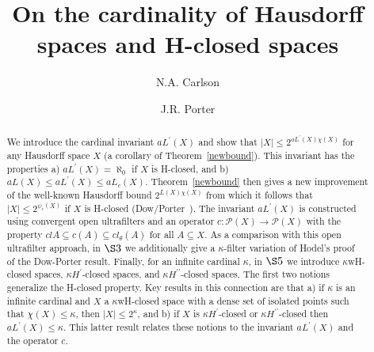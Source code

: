 \documentclass[11pt]{amsart}
\theoremstyle{definition}
\theoremstyle{remark}
\numberwithin{equation}{section}
\begin{document}
\title{On the cardinality of Hausdorff spaces and H-closed spaces}

\author{N.A. Carlson}\address{Department of Mathematics, California Lutheran University, 60 W. Olsen Rd, MC 3750, Thousand Oaks, CA 91360 USA}

\author{J.R. Porter}
\address{Department of Mathematics, University of Kansas, 405 Snow Hall, 1460 Jayhawk Blvd, Lawrence, KS 66045-7523, USA}



\begin{abstract} 
We introduce the cardinal invariant $aL^\prime(X)$ and show that $|X|\leq 2^{aL^\prime(X)\chi(X)}$ for any Hausdorff space $X$ (a corollary of Theorem~\ref{newbound}). This invariant has the properties a) $aL^\prime(X)=\aleph_0$ if $X$ is H-closed, and b) $aL(X)\leq aL^\prime(X)\leq aL_c(X)$. Theorem~\ref{newbound} then gives a new improvement of the well-known Hausdorff bound $2^{L(X)\chi(X)}$ from which it follows that $|X|\leq 2^{\psi_c(X)}$ if $X$ is H-closed (Dow/Porter~\cite{DowPorter82}). The invariant $aL^\prime(X)$ is constructed using convergent open ultrafilters and an operator $c:{\ensuremath{\mathcal{{P}}}}(X)\to{\ensuremath{\mathcal{{P}}}}(X)$ with the property $clA{\subseteq} c(A){\subseteq} cl_\theta(A)$ for all $A{\subseteq} X$. As a comparison with this open ultrafilter approach, in $\S 3$ we additionally give a $\kappa$-filter variation of Hodel's proof~\cite{Hodel2006} of the Dow-Porter result. Finally, for an infinite cardinal $\kappa$, in $\S 5$ we introduce $\kappa$wH-closed spaces, $\kappa H^\prime$-closed spaces, and $\kappa H^{\prime\prime}$-closed spaces. The first two notions generalize the H-closed property. Key results in this connection are that a) if $\kappa$ is an infinite cardinal and $X$ a $\kappa$wH-closed space with a dense set of isolated points such that $\chi(X)\leq\kappa$, then $|X|\leq 2^{\kappa}$, and b) if $X$ is $\kappa H^\prime$-closed or $\kappa H^{\prime\prime}$-closed then $aL^\prime(X)\leq\kappa$. This latter result relates these notions to the invariant $aL^\prime(X)$ and the operator $c$.
\end{abstract}

\maketitle
\end{document}

